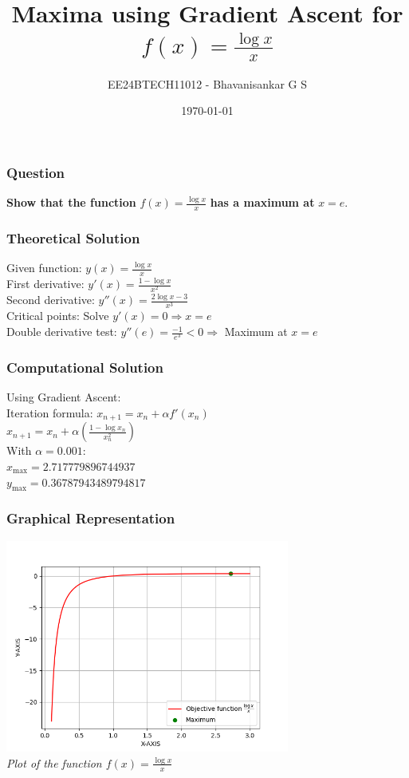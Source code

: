 \documentclass{beamer}
\title{Maxima using Gradient Ascent for $f(x) = \frac{\log{x}}{x}$}
\author{EE24BTECH11012 - Bhavanisankar G S}
\date{\today}
\begin{document}
\frame{\titlepage}

\begin{frame}
\frametitle{Question}
\textbf{Show that the function} $f(x) = \frac{\log{x}}{x}$ \textbf{has a maximum at} $x = e$.
\end{frame}

\begin{frame}
\frametitle{Theoretical Solution}
Given function: $y(x) = \frac{\log{x}}{x}$ \\[0.2cm]
First derivative: $y'(x) = \frac{1 - \log{x}}{x^2}$ \\[0.2cm]
Second derivative: $y''(x) = \frac{2 \log{x} - 3}{x^3}$\\[0.2cm]
Critical points: Solve $y'(x) = 0 \Rightarrow x = e$ \\[0.2cm]
Double derivative test: $y''(e) = \frac{-1}{e^3} < 0 \Rightarrow$ Maximum at $x = e$
\end{frame}

\begin{frame}
\frametitle{Computational Solution}
Using Gradient Ascent: \\[0.2cm]
Iteration formula: $x_{n+1} = x_n + \alpha f'(x_n)$ \\[0.2cm]
		   $x_{n+1} = x_{n} + \alpha \left( {\frac{1 - \log{x_{n}}}{x_{n}^2}} \right)$ \\[0.2cm]
With $\alpha = 0.001$: \\[0.2cm]
$x_{\text{max}} = 2.717779896744937$ \\
$y_{\text{max}} = 0.36787943489794817$
\end{frame}

\begin{frame}
\frametitle{Graphical Representation}
\begin{center}
\includegraphics[width=0.7\textwidth]{fig.png} \\
\textit{Plot of the function $f(x) = \frac{\log{x}}{x}$}
\end{center}
\end{frame}
\end{document}
